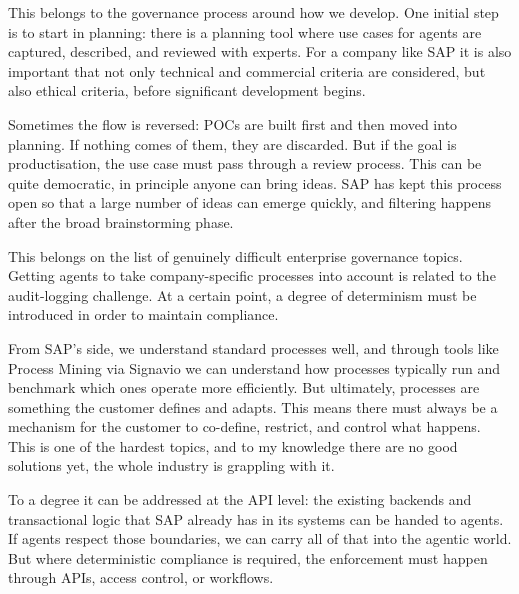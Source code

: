 \medskip{}

This belongs to the governance process around how we develop. One initial step is to start in planning: there is a planning tool where use cases for agents are captured, described, and reviewed with experts. For a company like SAP it is also important that not only technical and commercial criteria are considered, but also ethical criteria, before significant development begins.

Sometimes the flow is reversed: POCs are built first and then moved into planning. If nothing comes of them, they are discarded. But if the goal is productisation, the use case must pass through a review process. This can be quite democratic, in principle anyone can bring ideas. SAP has kept this process open so that a large number of ideas can emerge quickly, and filtering happens after the broad brainstorming phase.

\medskip{}

This belongs on the list of genuinely difficult enterprise governance topics. Getting agents to take company-specific processes into account is related to the audit-logging challenge. At a certain point, a degree of determinism must be introduced in order to maintain compliance.

From SAP's side, we understand standard processes well, and through tools like Process Mining via Signavio we can understand how processes typically run and benchmark which ones operate more efficiently. But ultimately, processes are something the customer defines and adapts. This means there must always be a mechanism for the customer to co-define, restrict, and control what happens. This is one of the hardest topics, and to my knowledge there are no good solutions yet, the whole industry is grappling with it.

To a degree it can be addressed at the API level: the existing backends and transactional logic that SAP already has in its systems can be handed to agents. If agents respect those boundaries, we can carry all of that into the agentic world. But where deterministic compliance is required, the enforcement must happen through APIs, access control, or workflows.

\medskip{}

